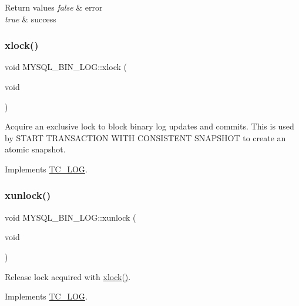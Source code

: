 \begin{DoxyRetVals}{Return values}
{\em false} & error \\
\hline
{\em true} & success \\
\hline
\end{DoxyRetVals}
\mbox{\label{group__Binary__Log_ga5ebea3ac42b19b6e1c86ca33c3cb28e7}} 
\subsubsection{\texorpdfstring{xlock()}{xlock()}}
{\footnotesize\ttfamily void M\+Y\+S\+Q\+L\+\_\+\+B\+I\+N\+\_\+\+L\+O\+G\+::xlock (\begin{DoxyParamCaption}\item[{void}]{ }\end{DoxyParamCaption})\hspace{0.3cm}{\ttfamily [virtual]}}

Acquire an exclusive lock to block binary log updates and commits. This is used by S\+T\+A\+RT T\+R\+A\+N\+S\+A\+C\+T\+I\+ON W\+I\+TH C\+O\+N\+S\+I\+S\+T\+E\+NT S\+N\+A\+P\+S\+H\+OT to create an atomic snapshot. 

Implements \mbox{\hyperlink{classTC__LOG_aac75dc061e9aae27449e675b23c27ae3}{T\+C\+\_\+\+L\+OG}}.

\mbox{\label{group__Binary__Log_gaee260f3856d7b1e557b91b7ecdc0b01c}} 
\subsubsection{\texorpdfstring{xunlock()}{xunlock()}}
{\footnotesize\ttfamily void M\+Y\+S\+Q\+L\+\_\+\+B\+I\+N\+\_\+\+L\+O\+G\+::xunlock (\begin{DoxyParamCaption}\item[{void}]{ }\end{DoxyParamCaption})\hspace{0.3cm}{\ttfamily [virtual]}}

Release lock acquired with \mbox{\hyperlink{group__Binary__Log_ga5ebea3ac42b19b6e1c86ca33c3cb28e7}{xlock()}}. 

Implements \mbox{\hyperlink{classTC__LOG_a60ee380273adc9e23c56ff114cd2636a}{T\+C\+\_\+\+L\+OG}}.



